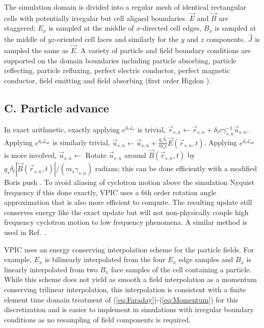 \documentclass[letter,10pt]{article}
\newcommand{\vecr}{\vec{r}}
\newcommand{\vecu}{\vec{u}}
\newcommand{\vecJ}{\vec{J}}
\newcommand{\vecE}{\vec{E}}
\newcommand{\vecB}{\vec{B}}
\newcommand{\op}{\mathcal{L}}
\newcommand{\eq}[1]{(\ref{eq:#1})}
\begin{document}
The simulation domain is divided into a regular mesh of identical
rectangular cells with potentially irregular but cell aligned
boundaries.  $\vecE$ and $\vecB$ are staggered; $E_x$ is sampled at
the middle of $x$-directed cell edges, $B_x$ is sampled at the middle
of $yz$-oriented cell faces and similarly for the $y$ and $z$
components.  $\vecJ$ is sampled the same as $\vecE$.  A variety of
particle and field boundary conditions are supported on the domain
boundaries including particle absorbing, particle reflecting, particle
refluxing, perfect electric conductor, perfect magnetic conductor,
field emitting and field absorbing (first order Higdon
\cite{Higdon_1986}).

\subsection{C. Particle advance}

In exact arithmetic, exactly applying $e^{\delta_t\op_r}$ is trivial,
$\vecr_{s,n} \leftarrow \vecr_{s,n} + \delta_t
c\gamma_{s,n}^{-1}\vecu_{s,n}$.  Applying $e^{\delta_t\op_{ue}}$ is
similarly trivial, $\vecu_{s,n}\leftarrow\vecu_{s,n} +
\frac{q_s\delta_t}{m_s c}\vecE\left(\vecr_{s,n},t\right)$.
Applying $e^{\delta_t\op_{ub}}$ is more involved, $\vecu_{s,n}
\leftarrow$ Rotate $\vecu_{s,n}$ around
$\vecB\left(\vecr_{s,n},t\right)$ by
$q_s\delta_t\left|\vecB\left(\vecr_{s,n},t\right)\right| /
\left(m_s\gamma_{s,n}\right)$ radians; this can be done efficiently
with a modified Boris push \cite{Boris_1970}.  To avoid aliasing of
cyclotron motion above the simulation Nyquist frequency if this done
exactly, VPIC uses a 6th order rotation angle approximation that is
also more efficient to compute.  The resulting update still conserves
energy like the exact update but will not non-physically couple high
frequency cyclotron motion to low frequency phenomena.  A similar
method is used in Ref.~\cite{Blahovec_et_al_2000}.

VPIC uses an energy conserving interpolation scheme for the particle
fields.  For example, $E_x$ is bilinearly interpolated from the four
$E_x$ edge samples and $B_x$ is linearly interpolated from two $B_x$
face samples of the cell containing a particle.  While this scheme
does not yield as smooth a field interpolation as a momentum
conserving trilinear interpolation, this interpolation is consistent
with a finite element time domain treatment of
\eq{Faraday}-\eq{Momentum} for this discretization
\cite{Eastwood_et_al_1995} and is easier to implement in simulations
with irregular boundary conditions as no resampling of field
components is required.
\end{document}
